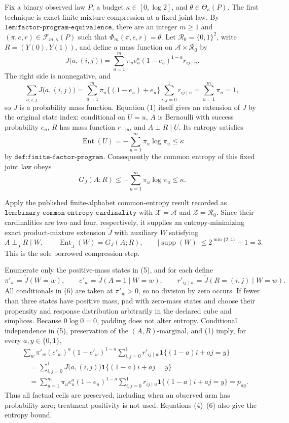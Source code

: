 Fix a binary observed law \(P\), a budget \(\kappa\in[0,\log2]\), and \(\theta\in\Theta_\kappa(P)\).  The first technique is exact finite-mixture compression at a fixed joint law.  By \(\texttt{lem:factor-program-equivalence}\), there are an integer \(m\geq1\) and \((\pi,e,r)\in\mathcal F_{m,\kappa}(P)\) such that \(\Phi_m(\pi,e,r)=\theta\).  Let \(\mathcal R_0=\{0,1\}^2\), write \(R=(Y(0),Y(1))\), and define a mass function on \(\mathcal A\times\mathcal R_0\) by
\[
J\bigl(a,(i,j)\bigr)=\sum_{u=1}^m\pi_u e_u^a(1-e_u)^{1-a}r_{ij\mid u}.
\tag{1}
\]
The right side is nonnegative, and
\[
\sum_{a,i,j}J\bigl(a,(i,j)\bigr)
=\sum_{u=1}^m\pi_u\{(1-e_u)+e_u\}
 \sum_{i,j=0}^1r_{ij\mid u}
=\sum_{u=1}^m\pi_u=1,
\tag{2}
\]
so \(J\) is a probability mass function.  Equation (1) itself gives an extension of \(J\) by the original state index: conditional on \(U=u\), \(A\) is Bernoulli with success probability \(e_u\), \(R\) has mass function \(r_{\cdot\cdot\mid u}\), and \(A\perp R\mid U\).  Its entropy satisfies
\[
\operatorname{Ent}(U)=-\sum_{u=1}^m\pi_u\log\pi_u\leq\kappa
\tag{3}
\]
by \(\texttt{def:finite-factor-program}\).  Consequently the common entropy of this fixed joint law obeys
\[
G_J(A;R)\leq-\sum_{u=1}^m\pi_u\log\pi_u\leq\kappa.
\tag{4}
\]

Apply the published finite-alphabet common-entropy result recorded as \(\texttt{lem:binary-common-entropy-cardinality}\) with \(\mathcal X=\mathcal A\) and \(\mathcal Z=\mathcal R_0\).  Since their cardinalities are two and four, respectively, it supplies an entropy-minimizing exact product-mixture extension \(\widetilde J\) with auxiliary \(W\) satisfying
\[
A\perp_{\widetilde J}R\mid W,\qquad
\operatorname{Ent}_{\widetilde J}(W)=G_J(A;R),\qquad
|\operatorname{supp}(W)|\leq2^{\min\{2,4\}}-1=3.
\tag{5}
\]
This is the sole borrowed compression step.

Enumerate only the positive-mass states in (5), and for each define
\[
\pi'_w=\widetilde J(W=w),\qquad
e'_w=\widetilde J(A=1\mid W=w),\qquad
r'_{ij\mid w}=\widetilde J(R=(i,j)\mid W=w).
\tag{6}
\]
All conditionals in (6) are taken at \(\pi'_w>0\), so no division by zero occurs.  If fewer than three states have positive mass, pad with zero-mass states and choose their propensity and response distribution arbitrarily in the declared cube and simplices.  Because \(0\log0=0\), padding does not alter entropy.  Conditional independence in (5), preservation of the \((A,R)\)-marginal, and (1) imply, for every \(a,y\in\{0,1\}\),
\[
\begin{aligned}
&\sum_w\pi'_w(e'_w)^a(1-e'_w)^{1-a}
 \sum_{i,j=0}^1r'_{ij\mid w}\mathbf 1\{(1-a)i+aj=y\}\\
&\quad=\sum_{i,j=0}^1J\bigl(a,(i,j)\bigr)\mathbf 1\{(1-a)i+aj=y\}\\
&\quad=\sum_{u=1}^m\pi_u e_u^a(1-e_u)^{1-a}
 \sum_{i,j=0}^1r_{ij\mid u}\mathbf 1\{(1-a)i+aj=y\}
=p_{ay}.
\end{aligned}
\tag{7}
\]
Thus all factual cells are preserved, including when an observed arm has probability zero; treatment positivity is not used.  Equations (4)--(6) also give the entropy bound.

